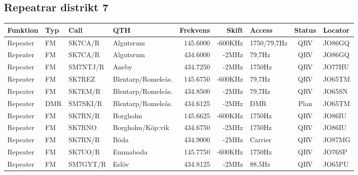 \begin{landscape}
\subsection{Repeatrar distrikt 7}
\footnotesize
\begin{longtable}{llllrrlcl}
	\textbf{Funktion} & \textbf{Typ} & \textbf{Call} & \textbf{QTH}        & \textbf{Frekvens} & \textbf{Skift} & \textbf{Access} & \textbf{Status} & \textbf{Locator} \\ \hline
\endhead
	Repeater          & FM           & SK7CA/R       & Algutsrum           &          145.6000 &        -600KHz & 1750/79,7Hz     &       QRV       & JO86GQ           \\
	Repeater          & FM           & SK7CA/R       & Algutsrum           &          434.6000 &          -2MHz & 79,7Hz          &       QRV       & JO86GQ           \\
	Repeater          & FM           & SM7NTJ/R      & Aneby               &          434.7250 &          -2MHz & 1750Hz          &       QRV       & JO77HU           \\
	Repeater          & FM           & SK7REZ        & Blentarp/Romeleås.  &          145.6750 &        -600KHz & 79,7Hz          &       QRV       & JO65TM           \\
	Repeater          & FM           & SK7EM/R       & Blentarp/Romeleås.  &          434.8500 &          -2MHz & 79,7Hz          &       QRV       & JO65SN           \\
	Repeater          & DMR          & SM7SKI/R      & Blentarp/Romeleås.  &          434.6125 &          -2MHz & DMR             &      Plan       & JO65TM           \\
	Repeater          & FM           & SK7RN/R       & Borgholm            &          145.6625 &        -600KHz & 1750Hz          &       QRV       & JO86IU           \\
	Repeater          & FM           & SK7RNO        & Borgholm/Köp:vik    &          434.6750 &          -2MHz & 1750Hz          &       QRV       & JO86IU           \\
	Repeater          & FM           & SK7RN/R       & Böda                &          434.9000 &          -2MHz & Carrier         &       QRV       & JO87MG           \\
	Repeater          & FM           & SK7UO/R       & Emmaboda            &          145.7750 &        -600KHz & 1750Hz          &       QRV       & JO76SP           \\
	Repeater          & FM           & SM7GYT/R      & Eslöv               &          434.8125 &          -2MHz & 88,5Hz          &       QRV       & JO65PU           \\

\end{longtable}
\end{landscape}
